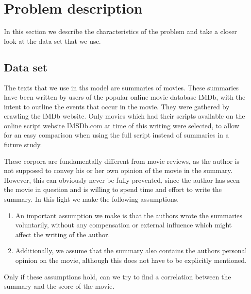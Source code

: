 \documentclass{article} %
\begin{document}
\section{Problem description}
\label{sec:problem}
In this section we describe the characteristics of the problem and take a closer look at the data set that we use.


\subsection{Data set}
The texts that we use in ths model are summaries of movies.
These summaries have been written by users of the popular online movie database IMDb, with the intent to outline the events that occur in the movie.
They were gathered by crawling the IMDb website.
Only movies which had their scripts available on the online script website \url{IMSDb.com} \cite{IMSDb} at time of this writing were selected, to allow for an easy comparison when using the full script instead of summaries in a future study.

These corpora are fundamentally different from movie reviews, as the author is not supposed to convey his or her own opinion of the movie in the summary.
However, this can obviously never be fully prevented, since the author has seen the movie in question and is willing to spend time and effort to write the summary.
In this light we make the following assumptions.

\begin{enumerate}
  \item An important assumption we make is that the authors wrote the summaries voluntarily, without any compensation or external influence which might affect the writing of the author.
  \item Additionally, we assume that the summary also contains the authors personal opinion on the movie, although this does not have to be explicitly mentioned.
\end{enumerate}
Only if these assumptions hold, can we try to find a correlation between the summary and the score of the movie.
\end{document}
